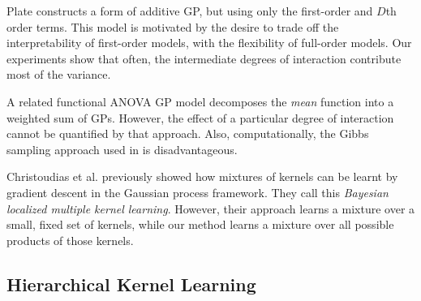 Plate\cite{plate1999accuracy} constructs a form of additive GP, but using only the first-order and $D$th order terms.  This model is motivated by the desire to trade off the interpretability of first-order models, with the flexibility of full-order models.  Our experiments show that often, the intermediate degrees of interaction contribute most of the variance.

A related functional ANOVA GP model\cite{kaufman2010bayesian} decomposes the \emph{mean} function into a weighted sum of GPs. However, the effect of a particular degree of interaction cannot be quantified by that approach. Also, computationally, the Gibbs sampling approach used in \cite{kaufman2010bayesian} is disadvantageous.


Christoudias et al.\cite{christoudias2009bayesian} previously showed how mixtures of kernels can be learnt by gradient descent in the Gaussian process framework.  They call this \emph{Bayesian localized multiple kernel learning}.
However, their approach learns a mixture over a small, fixed set of kernels, while our method learns a mixture over all possible products of those kernels.

\subsection{Hierarchical Kernel Learning}

